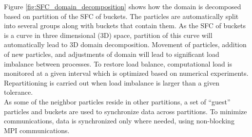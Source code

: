 \documentclass[procedia]{easychair}
\begin{document}
Figure \ref{fig:SFC_domain_decomposition} shows how the domain is decomposed based on partition of the SFC of buckets. The particles are automatically split into several groups along with buckets that contain them. As the SFC of buckets is a curve in three dimensional (3D) space, partition of this curve will automatically lead to 3D domain decomposition. 
Movement of particles, addition of new particles, and adjustments of domain will lead to significant load imbalance between processes. To restore load balance, computational load is monitored at a given interval which is optimized based on numerical experiments. Repartitioning is carried out when load imbalance is larger than a given tolerance.
\\
As some of the neighbor particles reside in other partitions, a set of ``guest'' particles and buckets are used to synchronize data across partitions. To minimize communications, data is synchronized only where needed, using non-blocking MPI communications. 
\end{document}
